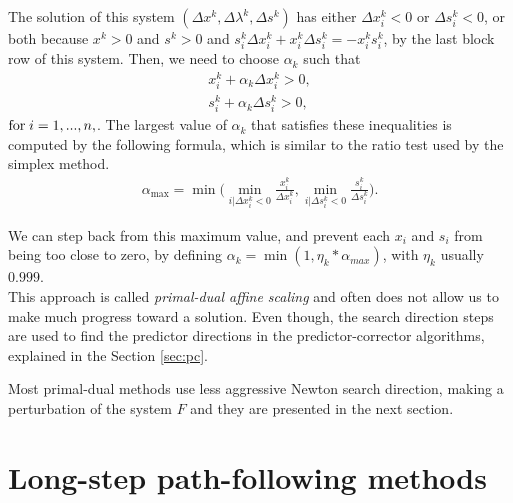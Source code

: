 \documentclass[a4paper,10 pt,titlepage,twoside]{book}
\theoremstyle{plain}
\theoremstyle{definition}
\theoremstyle{remark}
\begin{document}
The solution of this system $\left(\Delta x^{k},\Delta\lambda^{k},\Delta s^{k}\right)$ has either $\Delta x_{i}^{k}<0$ or $\Delta s_{i}^{k}<0$, or both because $x^{k}>0$ and $s^{k}>0$ and $s^{k}_{i}\Delta x^{k}_{i} + x^{k}_{i}\Delta s^{k}_{i} = - x^{k}_{i}s^{k}_{i}$, by the last block row of this system.
Then, we need to choose $\alpha_{k}$ such that
\begin{align*}
x^{k}_{i} + \alpha_{k} \Delta x^{k}_{i} >0, \\
s^{k}_{i} + \alpha_{k} \Delta s^{k}_{i} >0,	
\end{align*}
$\text{for\;} i = 1,...,n,$. The largest value of $\alpha_{k}$ that satisfies these inequalities is computed by the following formula, which is similar to the ratio test used by the simplex method. 
\begin{align*}
\alpha_{\text{max}} = \min\bigg(\min_{i|\Delta x^{k}_{i}<0}\frac{x^{k}_{i}}{\Delta x^{k}_{i}}, \min_{i|\Delta s^{k}_{i}<0}\frac{s^{k}_{i}}{\Delta s^{k}_{i}}\bigg).
\end{align*} 

We can step back from this maximum value, and prevent each $x_{i}$ and $s_{i}$ from being too close to zero, by defining $\alpha_{k} = \min\left(1,\eta_{k}*\alpha_{max}\right)$, with $\eta_{k}$ usually $0.999$.\\
This approach is called \textit{primal-dual affine scaling} and often does not allow us to make much progress toward a solution. 
Even though, the search direction steps are used to find the predictor directions in the predictor-corrector algorithms, explained in the Section \ref{sec:pc}.

Most primal-dual methods use less aggressive Newton search direction, making a perturbation of the system $F$ and they are presented in the next section.

\section{Long-step path-following methods}
\end{document}
